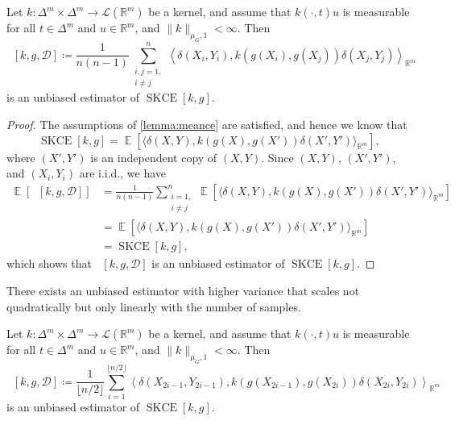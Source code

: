 \documentclass{article}
\DeclareMathOperator{\Expect}{\mathbb{E}}
\DeclareMathOperator{\squaredkernelmeasure}{SKCE}
\DeclareMathOperator{\unbiasedestimator}{\widehat{SKCE}_{uq}}
\DeclareMathOperator{\linearestimator}{\widehat{SKCE}_{ul}}
\begin{document}
\begin{lemma}\label{lemma:skce_unbiased}
  Let $k \colon \Delta^m \times \Delta^m \to \mathcal{L}(\mathbb{R}^m)$ be a
  kernel, and assume that $k(\cdot,t) u$ is measurable for all $t \in \Delta^m$
  and $u \in \mathbb{R}^m$, and $\|k\|_{\mu_G,1} < \infty$. Then
  \begin{equation*}
    \unbiasedestimator[k, g, \mathcal{D}] \coloneqq \frac{1}{n(n-1)} \sum_{\substack{i,j=1,\\i\neq j}}^n \left\langle \delta(X_i, Y_i), k(g(X_i), g(X_j)) \delta(X_j, Y_j)\right\rangle_{\mathbb{R}^m}
  \end{equation*}
  is an unbiased estimator of $\squaredkernelmeasure[k, g]$.
\end{lemma}

\begin{proof}
  The assumptions of \cref{lemma:meance} are satisfied, and hence we know that
  \begin{equation*}
    \squaredkernelmeasure[k, g] = \Expect[\langle \delta(X, Y), k(g(X), g(X')) \delta(X', Y')\rangle_{\mathbb{R}^m}],
  \end{equation*}
  where $(X', Y')$ is an independent copy of $(X,Y)$. Since $(X,Y)$, $(X',Y')$,
  and $(X_i, Y_i)$ are i.i.d., we have
  \begin{equation*}
    \begin{split}
      \Expect[\unbiasedestimator[k, g, \mathcal{D}]] &= \frac{1}{n(n-1)} \sum_{\substack{i=1,\\i\neq j}}^n \Expect[\langle \delta(X,Y), k(g(X), g(X')) \delta(X',Y')\rangle_{\mathbb{R}^m}] \\
      &= \Expect[\langle \delta(X,Y), k(g(X),g(X')) \delta(X',Y')\rangle_{\mathbb{R}^m}] \\
      &= \squaredkernelmeasure[k, g],
    \end{split}
  \end{equation*}
  which shows that $\unbiasedestimator[k, g, \mathcal{D}]$ is an unbiased
  estimator of $\squaredkernelmeasure[k, g]$.
\end{proof}

There exists an unbiased estimator with higher variance that scales not
quadratically but only linearly with the number of samples.

\begin{lemma}\label{lemma:skce_linear}
  Let $k \colon \Delta^m \times \Delta^m \to \mathcal{L}(\mathbb{R}^m)$ be a
  kernel, and assume that $k(\cdot,t) u$ is measurable for all $t \in \Delta^m$
  and $u \in \mathbb{R}^m$, and $\|k\|_{\mu_G,1} < \infty$. Then
  \begin{equation*}
    \linearestimator[k, g, \mathcal{D}] \coloneqq \frac{1}{\lfloor n / 2 \rfloor} \sum_{i=1}^{\lfloor n / 2 \rfloor} \left\langle \delta(X_{2i-1}, Y_{2i-1}), k(g(X_{2i-1}), g(X_{2i})) \delta(X_{2i}, Y_{2i})\right\rangle_{\mathbb{R}^m}
  \end{equation*}
  is an unbiased estimator of $\squaredkernelmeasure[k, g]$.
\end{lemma}
\end{document}

